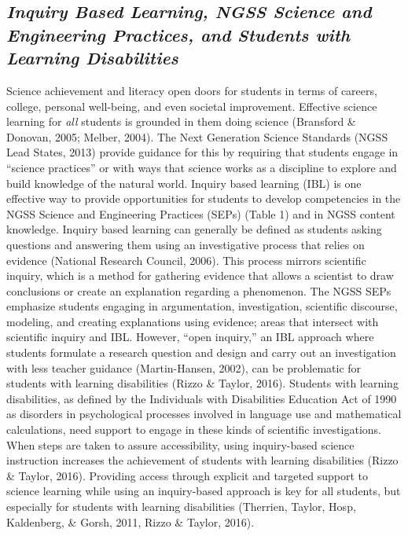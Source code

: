 \documentclass[11pt]{sig-alternate}
\begin{document}
\begin{large}
\subsection*{\textit{Inquiry Based Learning, NGSS Science and Engineering Practices, and Students with Learning Disabilities}}
Science achievement and literacy open doors for students in terms of careers, college, personal well-being, and even societal improvement. Effective science learning for \textit{all} students is grou\-nded in them doing science (Bransford \& Donovan, 2005; Melber, 2004). The Next Generation Science Standards (NGSS Lead States, 2013) provide guidance for this by requiring that students engage in “science practices” or with ways that science works as a discipline to explore and build knowledge of the natural world. Inquiry based learning (IBL) is one effective way to provide opportunities for students to develop competencies in the NGSS Science and Engineering Practices (SEPs) (Table 1) and in NGSS content knowledge. Inquiry based learning can generally be defined as students asking questions and answering them using an investigative process that relies on evidence (National Research Council, 2006). This process mirrors scientific inquiry, which is a method for gathering evidence that allows a scientist to draw conclusions or create an explanation regarding a phenomenon. The NGSS SEPs emphasize students engaging in argumentation, investigation, scientific discourse, modeling, and creating explanations using evidence; areas that intersect with scientific inquiry and IBL. However, “open inquiry,” an IBL approach where students formulate a research question and design and carry out an investigation with less teacher guidance (Martin-Hansen, 2002), can be problematic for students with learning disabilities (Rizzo \& Taylor, 2016). Students with learning disabilities, as defined by the Individuals with Disabilities Education Act of 1990 as disorders in psychological processes involved in language use and mathematical calculations, need support to engage in these kinds of scientific investigations. When steps are taken to assure accessibility, using inquiry-based science instruction increases the achievement of students with learning disabilities (Rizzo \& Taylor, 2016). Providing access through explicit and targeted support to science learning while using an inquiry-based approach is key for all students, but especially for students with learning disabilities (Therrien, Taylor, Hosp, Kaldenberg, \& Gorsh, 2011, Rizzo \& Taylor, 2016).


\end{large}
\end{document}
